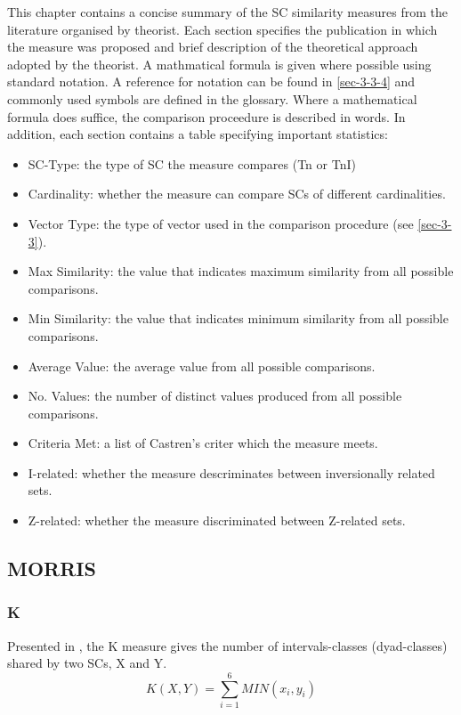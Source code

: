 \documentclass{article}
\begin{document}
This chapter contains a concise summary of the SC similarity measures
from the literature organised by theorist. Each section specifies the
publication in which the measure was proposed and brief description of
the theoretical approach adopted by the theorist. A mathmatical
formula is given where possible using standard notation. A reference
for notation can be found in \ref{sec-3-3-4} and commonly used symbols are
defined in the glossary. Where a mathematical formula does suffice,
the comparison proceedure is described in words. In addition, each
section contains a table specifying important statistics:
\begin{itemize}
\item SC-Type: the type of SC the measure compares (Tn or TnI)
\item Cardinality: whether the measure can compare SCs of different
  cardinalities.
\item Vector Type: the type of vector used in the comparison procedure
  (see \ref{sec-3-3}).
\item Max Similarity: the value that indicates maximum similarity from all
  possible comparisons.
\item Min Similarity: the value that indicates minimum similarity from all
  possible comparisons.
\item Average Value: the average value from all possible comparisons.
\item No. Values: the number of distinct values produced from all possible
  comparisons.
\item Criteria Met: a list of Castren's criter which the measure meets.
\item I-related: whether the measure descriminates between inversionally
  related sets.
\item Z-related: whether the measure discriminated between Z-related sets.
\end{itemize}
\subsection{MORRIS}
\label{sec-15-1}
\subsubsection{K}
\label{sec-15-1-1}

Presented in \citet[pp. 448]{Morris1979}, the K measure gives the
number of intervals-classes (dyad-classes) shared by two SCs, X and Y.
$$ K(X,Y)= \sum_{i=1}^{6}{MIN(x_{i},y_{i})} $$
\end{document}
